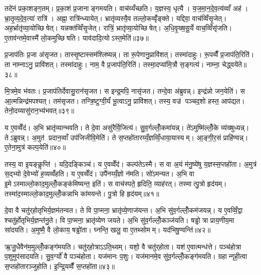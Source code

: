 तदे॑नं प्रका॒शङ्ग॒तम्। प्र॒का॒शं प्र॒जानाङ्गमयति। वाच॑य्यँच्छति। य॒ज्ञस्य॒ धृत्यै। य॒ज॒मा॒न॒दे॒व॒त्य॑व्वाँ अह॑। भ्रा॒तृ॒व्य॒दे॒व॒त्या॑ रात्रि॑। अह्ना॒ रात्रि॑न्ध्यायेत्। भ्रातृ॑व्यस्यै॒व तल्लो॒कव्वृँ॑ङ्क्ते। यद्दिवा॒ वाच॑व्विँसृ॒जेत्। अह॒र्भ्रातृ॑व्या॒योच्छिषेत्। यन्नक्त॑व्विँसृ॒जेत्। रात्रिं॒ भ्रातृ॑व्या॒योच्छिषेत्। अ॒धि॒वृ॒ख्ष॒सू॒र्ये वाच॒व्विँसृ॑जति। ए॒ताव॑न्तमे॒वास्मै॑ लो॒कमुच्छिषति। याव॑दादि॒त्योऽस्त॒मेति॑॥३७॥\anuvakamend[पृश्ञि॑ तिष्ठन्ति गमयति शिषे॒त्पञ्च॑ च]

प्र॒जाप॑तिः प्र॒जा अ॑सृजत। तास्सृ॒ष्टास्सम॑श्लिष्यन्न्। ता रू॒पेणानु॒प्रावि॑शत्। तस्मा॑दाहुः। रू॒पव्वैँ प्र॒जाप॑ति॒रिति॑। ता नाम्नाऽनु॒ प्रावि॑शत्। तस्मा॑दाहुः। नाम॒ वै प्र॒जाप॑ति॒रिति॑। तस्मा॒दप्या॑मि॒त्रौ स॒ङ्गत्य॑। नाम्ना॒ चेद्ध्वये॑ते॥३८॥

मि॒त्रमे॒व भ॑वतः। प्र॒जाप॑तिर्देवासु॒रान॑सृजत। स इन्द्र॒मपि॒ नासृ॑जत। तन्दे॒वा अ॑ब्रुवन्न्। इन्द्र॑न्नो जन॒येति॑। स आ॒त्मन्निन्द्र॑मपश्यत्। तम॑सृजत। तन्त्रि॒ष्टुग्वी॒र्यं॑ भू॒त्वाऽनु॒ प्रावि॑शत्। तस्य॒ वज्र॑ पञ्चद॒शो हस्त॒ आप॑द्यत। तेनो॒दय्यासु॑रान॒भ्य॑भवत्॥३९॥

य ए॒वव्वेँद॑। अ॒भि भ्रातृ॑व्यान्भवति। ते दे॒वा असु॑रैर्वि॒जित्य॑। सु॒व॒र्गल्लोँ॒कमा॑यन्न्। ते॑ऽमुष्मि॑ल्लोँ॒के व्य॑ख्षुध्यन्न्। तेऽब्रुवन्न्। अ॒मुत॑ प्रदान॒व्वाँ उप॑जिजीवि॒मेति॑। ते स॒प्तहो॑तारय्यँ॒ज्ञव्विँ॒धाया॒यास्यम्। आ॒ङ्गी॒र॒सं प्राहि॑ण्वन्न्। ए॒तेना॒मुत्र॑ कल्प॒येति॑॥४०॥

तस्य॒ वा इ॒यङ्कॢप्ति॑। यदि॒दङ्किञ्च॑। य ए॒वव्वेँद॑। कल्प॑तेऽस्मै। स वा अ॒यं म॑नु॒ष्ये॑षु य॒ज्ञस्स॒प्तहो॑ता। अ॒मुत्र॑ स॒द्भ्यो दे॒वेभ्यो॑ ह॒व्यव्वँ॑हति। य ए॒वव्वेँद॑। उपै॑नय्यँ॒ज्ञो न॑मति। सो॑ऽमन्यत। अ॒भि वा इ॒मेऽस्माल्लो॒काद॒मुल्लोँ॒कङ्क॑मिष्यन्त॒ इति॑। स वाच॑स्पते॒ हृदिति॒ व्याह॑रत्। तस्मात्पु॒त्रो हृद॑यम्। तस्मा॑द॒स्माल्लो॒काद॒मुल्लोँ॒कन्नाभि का॑मयन्ते। पु॒त्रो हि हृद॑यम्॥४१॥\anuvakamend[ह्वये॑ते अभवत्कल्प॒येतीति॑ च॒त्वारि॑ च]

दे॒वा वै चतु॑र्‌होतृभिर्य॒ज्ञम॑तन्वत। ते वि पा॒प्मना॒ भ्रातृ॑व्ये॒णाज॑यन्त। अ॒भि सु॑व॒र्गल्लोँ॒कम॑जयन्न्। य ए॒वव्विँ॒द्वा श्चतु॑र्होतृभिर्य॒ज्ञन्त॑नु॒ते। वि पा॒प्मना॒ भ्रातृ॑व्येण जयते। अ॒भि सु॑व॒र्गल्लोँ॒कञ्ज॑यति। षड्ढोत्रा प्राय॒णीय॒मा सा॑दयति। अ॒मुष्मै॒ वै लो॒काय॒ षड्ढो॑ता। घ्नन्ति॒ खलु॒ वा ए॒तथ्सोमम्। यद॑भिषु॒ण्वन्ति॑॥४२॥

ऋ॒जु॒धैवैन॑म॒मुल्लोँ॒कङ्ग॑मयति। चतु॑र्‌होत्राऽऽति॒थ्यम्। यशो॒ वै चतु॑र्‌होता। यश॑ ए॒वात्मन्ध॑त्ते। पञ्च॑होत्रा प॒शुमुप॑सादयति। सु॒व॒र्ग्यो॑ वै पञ्च॑होता। यज॑मानः प॒शुः। यज॑मानमे॒व सु॑व॒र्गल्लोँ॒कङ्ग॑मयति। ग्रहान्गृही॒त्वा स॒प्तहो॑तारञ्जुहोति। इ॒न्द्रि॒यव्वैँ स॒प्तहो॑ता॥४३॥

